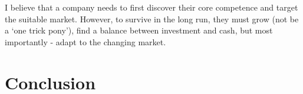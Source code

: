 \documentclass[twocolumn]{bmcart}%
\begin{document}
\par I believe that a company needs to first discover their core competence and target the suitable market. However, to survive in the long run, they must grow (not be a `one trick pony'), find a balance between investment and cash, but most importantly - adapt to the changing market.
      
\section*{Conclusion}



\begin{backmatter}

\nocite{*}

\end{backmatter}
\end{document}

